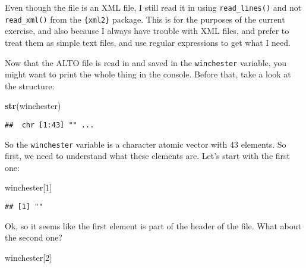 \documentclass[
]{article}
\newenvironment{Shaded}{\begin{snugshade}}{\end{snugshade}}
\newcommand{\DecValTok}[1]{\textcolor[rgb]{0.00,0.00,0.81}{#1}}
\newcommand{\KeywordTok}[1]{\textcolor[rgb]{0.13,0.29,0.53}{\textbf{#1}}}
\newcommand{\NormalTok}[1]{#1}
\begin{document}
Even though the file is an XML file, I still read it in using \texttt{read\_lines()} and not \texttt{read\_xml()}
from the \texttt{\{xml2\}} package. This is for the purposes of the current exercise, and also because I
always have trouble with XML files, and prefer to treat them as simple text files, and use regular
expressions to get what I need.

Now that the ALTO file is read in and saved in the \texttt{winchester} variable, you might want to print
the whole thing in the console. Before that, take a look at the structure:

\begin{Shaded}
\begin{Highlighting}[]
\KeywordTok{str}\NormalTok{(winchester)}
\end{Highlighting}
\end{Shaded}

\begin{verbatim}
##  chr [1:43] "" ...
\end{verbatim}

So the \texttt{winchester} variable is a character atomic vector with 43 elements. So first, we need to
understand what these elements are. Let's start with the first one:

\begin{Shaded}
\begin{Highlighting}[]
\NormalTok{winchester[}\DecValTok{1}\NormalTok{]}
\end{Highlighting}
\end{Shaded}

\begin{verbatim}
## [1] ""
\end{verbatim}

Ok, so it seems like the first element is part of the header of the file. What about the second one?

\begin{Shaded}
\begin{Highlighting}[]
\NormalTok{winchester[}\DecValTok{2}\NormalTok{]}
\end{Highlighting}
\end{Shaded}
\end{document}
